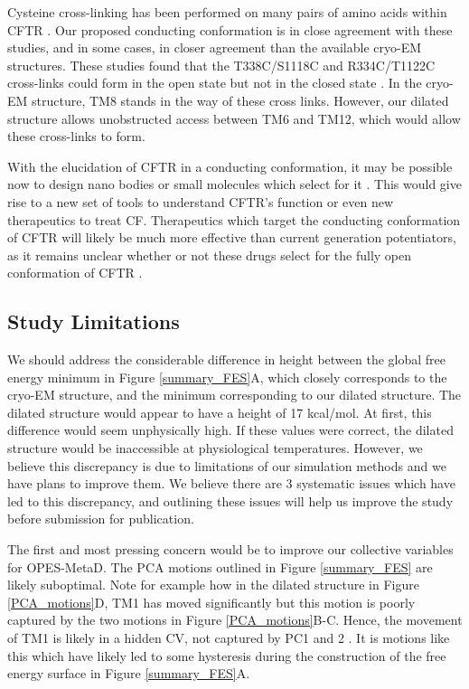 Cysteine cross-linking has been performed on many pairs of amino acids within CFTR \cite{negoda2019, cui2008, negoda2018, wang2012}. Our proposed conducting conformation is in close agreement with these studies, and in some cases, in closer agreement than the available cryo-EM structures. These studies found that the T338C/S1118C and R334C/T1122C cross-links could form in the open state but not in the closed state \cite{wang2012}. In the cryo-EM structure, TM8 stands in the way of these cross links. However, our dilated structure allows unobstructed access between TM6 and TM12, which would allow these cross-links to form. 

With the elucidation of CFTR in a conducting conformation, it may be possible now to design nano bodies or small molecules which select for it \cite{hutter2019}. This would give rise to a new set of tools to understand CFTR's function or even new therapeutics to treat CF. Therapeutics which target the conducting conformation of CFTR will likely be much more effective than current generation potentiators, as it remains unclear whether or not these drugs select for the fully open conformation of CFTR \cite{csanady2019, yeh2017}. 

\subsection{Study Limitations}

We should address the considerable difference in height between the global free energy minimum in Figure \ref{summary_FES}A, which closely corresponds to the cryo-EM structure, and the minimum corresponding to our dilated structure. The dilated structure would appear to have a height of 17 kcal/mol. At first, this difference would seem unphysically high. If these values were correct, the dilated structure would be inaccessible at physiological temperatures. However, we believe this discrepancy is due to limitations of our simulation methods and we have plans to improve them. We believe there are 3 systematic issues which have led to this discrepancy, and outlining these issues will help us improve the study before submission for publication. 

The first and most pressing concern would be to improve our collective variables for OPES-MetaD. The PCA motions outlined in Figure \ref{summary_FES} are likely suboptimal. Note for example how in the dilated structure in Figure \ref{PCA_motions}D, TM1 has moved significantly but this motion is poorly captured by the two motions in Figure \ref{PCA_motions}B-C. Hence, the movement of TM1 is likely in a hidden CV, not captured by PC1 and 2 \cite{bussi2015, bussi2020a}. It is motions like this which have likely led to some hysteresis during the construction of the free energy surface in Figure \ref{summary_FES}A. 

